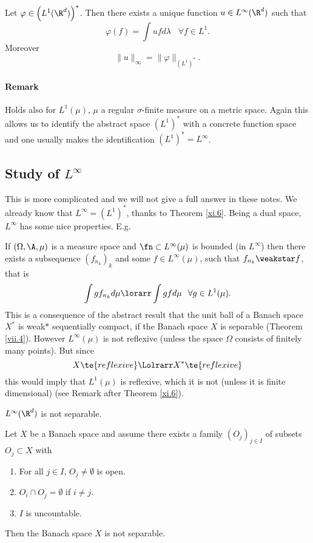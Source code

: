 \begin{thm}\label{xi.6}
	Let $\varphi\in\left(L^1(\R^d)\right)^*$. Then there exists a unique function $u\in L^\infty(\R^d)$ such that
	\[\varphi(f)=\int ufd\lambda\;\;\;\forall f\in L^1.\]
	Moreover
	\[\|u\|_\infty=\|\varphi\|_{\left(L^1\right)^*}.\]
\end{thm}

\paragraph{Remark}
Holds also for $L^1(\mu)$, $\mu$ a regular $\sigma$-finite measure on a metric space. Again this allows us to identify the abstract space $\left(L^1\right)^*$ with a concrete function space and one usually makes the identification $\left(L^1\right)^*=L^\infty$.

\subsection{Study of $L^\infty$}

This is more complicated and we will not give a full answer in these notes. We already know that $L^\infty=(L^1)^*$, thanks to Theorem \ref{xi.6}. Being a dual space, $L^\infty$ has some nice properties. E.g.\vspace{1mm}

If $(\Omega,\A,\mu)$ is a measure space and $\fn\subset L^\infty(\mu)$ is bounded (in $L^\infty$) then there exists a subsequence $(f_{n_k})_k$ and some $f\in L^\infty(\mu)$, such that $f_{n_k}\weakstar f$, that is
\[\int gf_{n_k}d\mu\lorarr\int gfd\mu\;\;\,\forall g\in L^1(\mu).\]
This is a consequence of the abstract result that the unit ball of a Banach space $X^*$ is weak$\ast$ sequentially compact, if the Banach space $X$ is separable (Theorem \ref{vii.4}). However $L^\infty(\mu)$ is not reflexive (unless the space $\Omega$ consists of finitely many points). But since
\[X\te{ reflexive }\Lolrarr X^*\te{ reflexive}\]
this would imply that $L^1(\mu)$ is reflexive, which it is not (unless it is finite dimensional) (see Remark after Theorem \ref{xi.6}).

\begin{thm}\label{xi.7}
	$L^\infty(\R^d)$ is not separable.
\end{thm}

\begin{lem}\label{xi.8}
	Let $X$ be a Banach space and assume there exists a family $(O_j)_{j\in I}$ of subsets $O_j\subset X$ with
	\begin{enumerate}[label=\alph*)]
		\item For all $j\in I$, $O_j\neq\emptyset$ is open.
		\item \label{xi.8.b}$O_i\cap O_j=\emptyset$ if $i\neq j$.
		\item \label{xi.8.c}$I$ is uncountable.
	\end{enumerate}
	Then the Banach space $X$ is not separable.
\end{lem}

